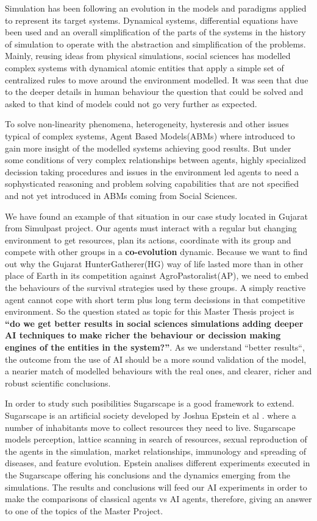 \documentclass[11pt,oneside,a4paper,openright]{report}
\begin{document}
Simulation has been following an evolution in the models and paradigms applied to represent its target
systems. Dynamical systems, differential equations have been used and an overall simplification of the parts of the systems in the history of simulation to operate with the abstraction and simplification of the problems.
Mainly, reusing ideas from physical simulations, social sciences has modelled complex systems with dynamical
atomic entities that apply a simple set of centralized rules to move around the environment modelled. It was seen that due to the deeper details in human behaviour the question that could be solved and asked to that kind of models could not go very further as expected.

To solve non-linearity phenomena, heterogeneity, hysteresis\cite[p.571–597]{hysteresisDef} and other issues typical of complex systems, Agent Based Models(ABMs) where introduced to gain more insight of the modelled systems achieving good results. But under 
some conditions of very complex relationships between agents, highly specialized decission taking procedures
and issues in the environment led agents to need a sophysticated reasoning and problem solving capabilities
that are not specified and not yet introduced in ABMs coming from Social Sciences.

We have found an example of that situation in our case study located in Gujarat from Simulpast project. Our agents must interact with a regular but changing environment to get resources, plan its actions, coordinate with its group and compete with other groups in a \textbf{co-evolution} dynamic. Because we want to find out why the Gujarat HunterGatherer(HG) way of life lasted more than in other place of Earth in its competition against AgroPastoralist(AP), we need to embed the behaviours of the survival strategies used by these groups. A simply reactive agent cannot cope with short term plus long term decissions in that competitive environment. So the question stated as topic for this Master Thesis project is \textbf{``do we get better results in social sciences simulations adding deeper AI techniques to make richer the behaviour or decission making engines of the entities in the system?''}. As we understand ``better results``, the outcome from the use of AI should be a more sound validation of the model, a nearier match of modelled behaviours with the real ones, and clearer, richer and robust scientific conclusions.

In order to study such posibilities Sugarscape is a good framework to extend. Sugarscape is an artificial society developed by Joshua Epstein et al \cite{EpsteinAxtell}. where a number of inhabitants move to collect resources they need to live. Sugarscape models perception, lattice scanning in search of resources, sexual reproduction of the agents in the simulation, market relationships, immunology and spreading of diseases, and feature evolution. Epstein analises different experiments executed in the Sugarscape offering his conclusions and the dynamics emerging from the simulations. The results and conclusions will feed our AI experiments in order to make the comparisons of classical  agents vs AI agents, therefore, giving an answer to one of the topics of the Master Project.
\end{document}

